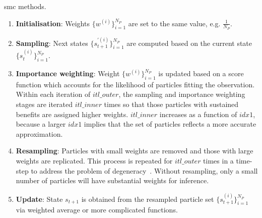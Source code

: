 \begin{algorithm}
\caption{\gls{smc} methods.}
\begin{algorithmic}[1]
			 \label{algo:s}
			 \label{algo:i}
		\ENDWHILE
	\ENDFOR
	\ENDIF
\ENDWHILE
{}
\ENDFOR
\end{algorithmic}
\label{algo:smc_bg}
\end{algorithm}

\begin{enumerate}
\item \textbf{Initialisation}: Weights $\{w^{(i)}\}^{N_P}_{i=1}$ are set to the same value, e.g. $\frac{1}{N_P}$.
\item \textbf{Sampling}: Next states $\{s_{t+1}^{\prime(i)}\}^{N_P}_{i=1}$ are computed based on the current state $\{s_{t}^{(i)}\}^{N_P}_{i=1}$.
\item \textbf{Importance weighting}: Weight $\{w^{(i)}\}^{N_P}_{i=1}$ is updated based on a score function which accounts for the likelihood of particles fitting the observation.
Within each iteration of $itl\_outer$, the sampling and importance weighting stages are iterated $itl\_inner$ times so that those particles with sustained benefits are assigned higher weights.
$itl\_inner$ increases as a function of $idx1$, because a larger $idx1$ implies that the set of particles reflects a more accurate approximation.
\item \textbf{Resampling}: Particles with small weights are removed and those with large weights are replicated.
This process is repeated for $itl\_outer$ times in a time-step to address the problem of degeneracy~\cite{kitagawa96}.
Without resampling, only a small number of particles will have substantial weights for inference.
\item \textbf{Update}: State $s_{t+1}$ is obtained from the resampled particle set $\{s_{t+1}^{(i)}\}^{N_P}_{i=1}$ via weighted average or more complicated functions.
\end{enumerate}

